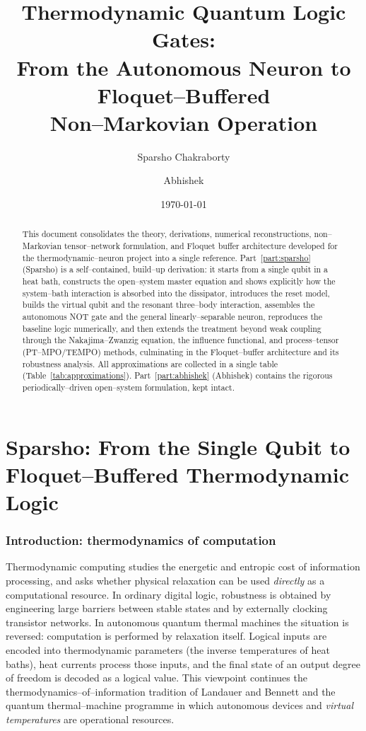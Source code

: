 \documentclass[11pt,a4paper]{article}
\title{\bfseries Thermodynamic Quantum Logic Gates:\\
From the Autonomous Neuron to Floquet--Buffered\\
Non--Markovian Operation}
\author{Sparsho Chakraborty \and Abhishek}
\date{\today}
\theoremstyle{plain}
\theoremstyle{definition}
\theoremstyle{remark}
\begin{document}
\maketitle

\begin{abstract}
\noindent
This document consolidates the theory, derivations, numerical
reconstructions, non--Markovian tensor--network formulation, and Floquet
buffer architecture developed for the thermodynamic--neuron project into
a single reference. Part~\ref{part:sparsho} (Sparsho) is a self--contained,
build--up derivation: it starts from a single qubit in a heat bath,
constructs the open--system master equation and shows explicitly how the
system--bath interaction is absorbed into the dissipator, introduces the
reset model, builds the virtual qubit and the resonant three--body
interaction, assembles the autonomous NOT gate and the general
linearly--separable neuron, reproduces the baseline logic numerically,
and then extends the treatment beyond weak coupling through the
Nakajima--Zwanzig equation, the influence functional, and process--tensor
(PT--MPO/TEMPO) methods, culminating in the Floquet--buffer architecture
and its robustness analysis. All approximations are collected in a single
table (Table~\ref{tab:approximations}). Part~\ref{part:abhishek}
(Abhishek) contains the rigorous periodically--driven open--system
formulation, kept intact.
\end{abstract}

\tableofcontents
\clearpage

\part{Sparsho: From the Single Qubit to Floquet--Buffered Thermodynamic Logic}
\label{part:sparsho}

\section{Introduction: thermodynamics of computation}
\label{sec:intro}
Thermodynamic computing studies the energetic and entropic cost of
information processing, and asks whether physical relaxation can be used
\emph{directly} as a computational resource. In ordinary digital logic,
robustness is obtained by engineering large barriers between stable
states and by externally clocking transistor networks. In autonomous
quantum thermal machines the situation is reversed: computation is
performed by relaxation itself. Logical inputs are encoded into
thermodynamic parameters (the inverse temperatures of heat baths), heat
currents process those inputs, and the final state of an output degree of
freedom is decoded as a logical value. This viewpoint continues the
thermodynamics--of--information tradition of Landauer and Bennett and the
quantum thermal--machine programme in which autonomous devices and
\emph{virtual temperatures} are operational resources.
\end{document}

